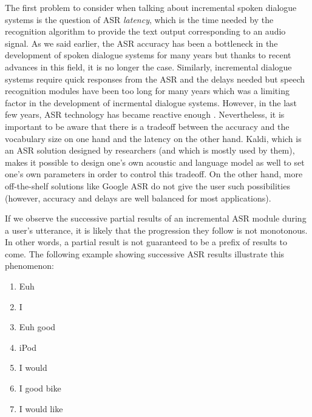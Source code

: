                 The first problem to consider when talking about incremental spoken dialogue systems is the question of ASR \textit{latency}, which is the time needed by the recognition algorithm to provide the text output corresponding to an audio signal. As we said earlier, the ASR accuracy has been a bottleneck in the development of spoken dialogue systems for many years but thanks to recent advances in this field, it is no longer the case. Similarly, incremental dialogue systems require quick responses from the ASR and the delays needed but speech recognition modules have been too long for many years which was a limiting factor in the development of incrmental dialogue systems. However, in the last few years, ASR technology has became reactive enough \cite{Platek2014}. Nevertheless, it is important to be aware that there is a tradeoff between the accuracy and the vocabulary size on one hand and the latency on the other hand. Kaldi, which is an ASR solution designed by researchers (and which is mostly used by them), makes it possible to design one's own acoustic and language model as well to set one's own parameters in order to control this tradeoff. On the other hand, more off-the-shelf solutions like Google ASR do not give the user such possibilities (however, accuracy and delays are well balanced for most applications).

                If we observe the successive partial results of an incremental ASR module during a user's utterance, it is likely that the progression they follow is not monotonous. In other words, a partial result is not guaranteed to be a prefix of results to come. The following example showing successive ASR results illustrate this phenomenon:

                \begin{enumerate}
                  \item Euh
                  \item I
                  \item Euh good
                  \item iPod
                  \item I would
                  \item I good bike
                  \item I would like
                \end{enumerate}

